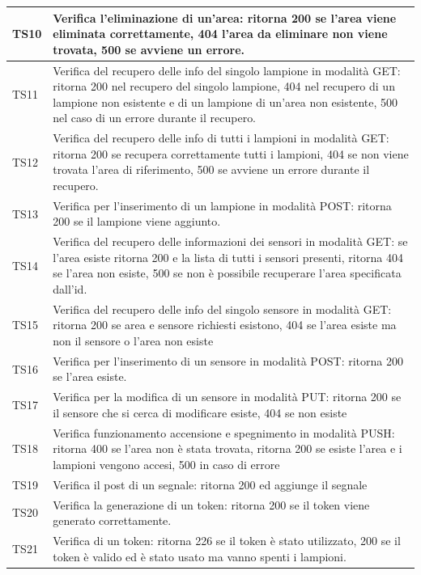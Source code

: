 \documentclass[a4paper, 12pt]{article}
\begin{document}
\begin{center}
	\begin{tabularx}{\textwidth}{|X|X|}
		\hline
		TS10 & Verifica l'eliminazione di un'area: ritorna 200 se l'area viene eliminata correttamente, 404 l'area da eliminare non viene trovata, 500 se avviene un errore. \\
		\hline
		TS11 &  Verifica del recupero delle info del singolo lampione in modalità GET: ritorna 200 nel recupero del singolo lampione, 404 nel recupero di un lampione non esistente e di un lampione di un'area non esistente, 500 nel caso di un errore durante il recupero.     \\
		\hline
		TS12 &  Verifica del recupero delle info di tutti i lampioni in modalità GET: ritorna 200 se recupera correttamente tutti i lampioni,  404 se non viene trovata l'area di riferimento, 500 se avviene un errore durante il recupero.   \\
		\hline
		TS13 & Verifica per l'inserimento di un lampione in modalità POST: ritorna 200 se il lampione viene aggiunto. \\
		\hline
		TS14 & Verifica del recupero delle informazioni dei sensori in modalità GET: se l'area esiste ritorna 200 e la lista di tutti i sensori presenti, ritorna 404 se l'area non esiste, 500 se non è possibile recuperare l'area specificata dall'id.  \\
		\hline
		TS15 & Verifica del recupero delle info del singolo sensore in modalità GET: ritorna 200 se area e sensore richiesti esistono, 404 se l'area esiste ma non il sensore o l'area non esiste \\
		\hline
		TS16 & Verifica per l'inserimento di un sensore in modalità POST: ritorna 200 se l'area esiste.   \\
		\hline
		TS17 & Verifica per la modifica di un sensore in modalità PUT: ritorna 200 se il sensore che si cerca di modificare esiste, 404 se non esiste  \\
		\hline
		TS18 & Verifica funzionamento accensione e spegnimento in modalità PUSH: ritorna 400 se l'area non è stata trovata, ritorna 200 se esiste l'area e i lampioni vengono accesi, 500 in caso di errore  \\
		\hline
		TS19 & Verifica il post di un segnale: ritorna 200 ed aggiunge il segnale  \\
		\hline
		TS20 & Verifica la generazione di un token: ritorna 200 se il token viene generato correttamente.  \\
		\hline
		TS21 & Verifica di un token: ritorna 226 se il token è stato utilizzato, 200 se il token è valido ed è stato usato ma vanno spenti i lampioni.  \\
		\hline
	\end{tabularx}\\[8pt]
	\mbox{}\\
\end{center}
\end{document}
